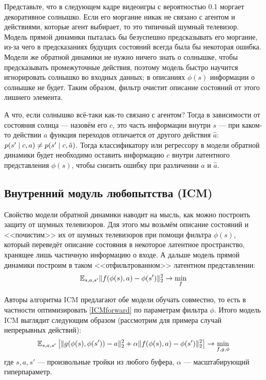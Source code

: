 \begin{example}
Представьте, что в следующем кадре видеоигры с вероятностью 0.1 моргает декоративное солнышко. Если его моргание никак не связано с агентом и действиями, которые агент выбирает, то это типичный шумный телевизор. Модель прямой динамики пыталась бы безуспешно предсказывать его моргание, из-за чего в предсказаниях будущих состояний всегда была бы некоторая ошибка. Модели же обратной динамики не нужно ничего знать о солнышке, чтобы предсказывать промежуточные действия, поэтому модель быстро научится игнорировать солнышко во входных данных; в описаниях $\phi(s)$ информации о солнышке не будет. Таким образом, фильтр очистит описание состояний от этого лишнего элемента.

А что, если солнышко всё-таки как-то связано с агентом? Тогда в зависимости от состояния солнца --- назовём его $c$, это часть информации внутри $s$ --- при каком-то действии $a$ функция переходов отличается от другого действия $\hat{a}$: $p(s' \HM \mid c, a) \neq p(s' \HM \mid c, \hat{a})$. Тогда классификатору или регрессору в модели обратной динамики будет необходимо оставить информацию $c$ внутри латентного представления $\phi(s)$, чтобы снизить ошибку при различении $a$ и $\hat{a}$.
\end{example}

\subsection{Внутренний модуль любопытства (ICM)}

Свойство модели обратной динамики наводит на мысль, как можно построить защиту от шумных телевизоров. Для этого мы возьмём описание состояний и <<почистим>> их от шумных телевизоров при помощи фильтра $\phi(s)$, который переведёт описание состояния в некоторое латентное пространство, хранящее лишь частичную информацию о входе. А дальше модель прямой динамики построим в таком <<отфильтрованном>> латентном представлении:
\begin{equation}\label{ICMforward}
\mathbb{E}_{s, a, s'} \|f(\phi(s), a) - \phi(s')\|^2_2 \to \min_{f}
\end{equation}

Авторы алгоритма ICM предлагают обе модели обучать совместно, то есть в частности оптимизировать \eqref{ICMforward} по параметрам фильтра $\phi$. Итого модель ICM выглядит следующим образом (рассмотрим для примера случай непрерывных действий):
$$\mathbb{E}_{s, a, s'} \left[ \|g(\phi(s), \phi(s')) - a\|^2_2 + \alpha \|f(\phi(s), a) - \phi(s')\|^2_2 \right] \to \min_{f, g, \phi}$$
где $s, a, s'$ --- произвольные тройки из любого буфера, $\alpha$ --- масштабирующий гиперпараметр. 

